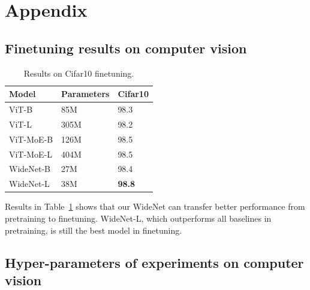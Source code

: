 \documentclass[letterpaper]{article} %
\begin{document}



\clearpage

\appendix
\section{Appendix}
\label{appendix}


\subsection{Finetuning results on computer vision}\label{appendix:cv-finetune}


\begin{table}[ht]
\centering
\caption{Results on Cifar10 finetuning.}
\label{tbl-main-finetune-Cifar10}
\begin{tabular}{l|l l}
\toprule
Model     & Parameters   & Cifar10\\ \midrule
ViT-B               & 85M       &  98.3      \\
ViT-L              & 305M         &   98.2    \\ \midrule
ViT-MoE-B           & 126M          &  98.5   \\
ViT-MoE-L           & 404M        &   98.5  \\ \midrule
WideNet-B         & 27M        &     98.4    \\
WideNet-L          & 38M     &       \textbf{98.8}    \\
\bottomrule
\end{tabular}
\end{table}


Results in Table~\ref{tbl-main-finetune-Cifar10} shows that our WideNet can transfer better performance from pretraining to finetuning. WideNet-L, which outperforms all baselines in pretraining, is still the best model in finetuning.



\subsection{Hyper-parameters of experiments on computer vision}\label{appendix:cv-hyper}
\end{document}
